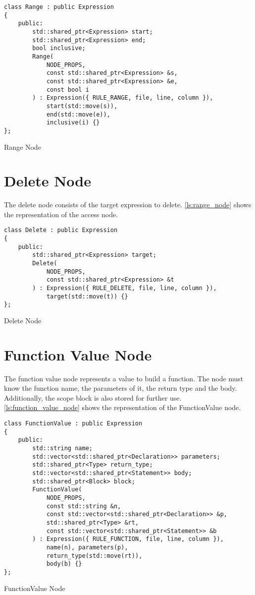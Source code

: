 \begin{listing}[H]
\begin{verbatim}
class Range : public Expression
{
    public:
        std::shared_ptr<Expression> start;
        std::shared_ptr<Expression> end;
        bool inclusive;
        Range(
            NODE_PROPS,
            const std::shared_ptr<Expression> &s,
            const std::shared_ptr<Expression> &e,
            const bool i
        ) : Expression({ RULE_RANGE, file, line, column }),
            start(std::move(s)),
            end(std::move(e)),
            inclusive(i) {}
};
\end{verbatim}
\caption{Range Node}
\label{ls:range_node}
\end{listing}

\section{Delete Node}

The delete node consists of the target expression to delete.
\autoref{ls:range_node} shows the representation of the access node.

\begin{listing}[H]
\begin{verbatim}
class Delete : public Expression
{
    public:
        std::shared_ptr<Expression> target;
        Delete(
            NODE_PROPS,
            const std::shared_ptr<Expression> &t
        ) : Expression({ RULE_DELETE, file, line, column }),
            target(std::move(t)) {}
};
\end{verbatim}
\caption{Delete Node}
\label{ls:delete_node}
\end{listing}

\section{Function Value Node}

The function value node represents a value to build a function. The node must know the function name,
the parameters of it, the return type and the body. Additionally, the scope block is also stored for further use.
\autoref{ls:function_value_node} shows the representation of the FunctionValue node.

\begin{listing}[H]
\begin{verbatim}
class FunctionValue : public Expression
{
    public:
        std::string name;
        std::vector<std::shared_ptr<Declaration>> parameters;
        std::shared_ptr<Type> return_type;
        std::vector<std::shared_ptr<Statement>> body;
        std::shared_ptr<Block> block;
        FunctionValue(
            NODE_PROPS,
            const std::string &n,
            const std::vector<std::shared_ptr<Declaration>> &p,
            std::shared_ptr<Type> &rt,
            const std::vector<std::shared_ptr<Statement>> &b
        ) : Expression({ RULE_FUNCTION, file, line, column }),
            name(n), parameters(p),
            return_type(std::move(rt)),
            body(b) {}
};
\end{verbatim}
\caption{FunctionValue Node}
\label{ls:function_value_node}
\end{listing}

